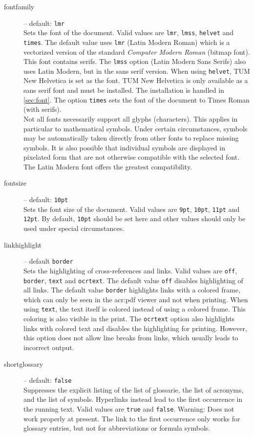 \begin{description}
	\item[fontfamily] -- default: \texttt{lmr} \\
	Sets the font of the document. Valid values are \texttt{lmr}, \texttt{lmss}, \texttt{helvet} and \texttt{times}. The default value uses \texttt{lmr} (Latin Modern Roman) which is a vectorized version of the \Latex standard \textit{Computer Modern Roman} (bitmap font). This font contains serifs. The \texttt{lmss} option (Latin Modern Sans Serifs) also uses Latin Modern, but in the sans serif version. When using \texttt{helvet}, TUM New Helvetica is set as the font. TUM New Helvetica is only available as a sans serif font and must be installed. The installation is handled in \autoref{sec:font}. The option \texttt{times} sets the font of the document to Times Roman (with serifs). \\
	Not all fonts necessarily support all glyphs (characters). This applies in particular to mathematical symbols. Under certain circumstances, symbols may be automatically taken directly from other fonts to replace missing symbols. It is also possible that individual symbols are displayed in pixelated form that are not otherwise compatible with the selected font. The Latin Modern font offers the greatest compatibility.
	
	\item[fontsize] -- default: \texttt{10pt} \\
	Sets the font size of the document. Valid values are \texttt{9pt}, \texttt{10pt}, \texttt{11pt} and \texttt{12pt}. By default, \texttt{10pt} should be set here and other values should only be used under special circumstances.
	
	\item[linkhighlight] -- default \texttt{border} \\
	Sets the highlighting of cross-references and links. Valid values are \texttt{off}, \texttt{border}, \texttt{text} and \texttt{ocrtext}. The default value \texttt{off} disables highlighting of all links. The default value \texttt{border} highlights links with a colored frame, which can only be seen in the \ac{acr:pdf} viewer and not when printing. When using \texttt{text}, the text itself is colored instead of using a colored frame. This coloring is also visible in the print. The \texttt{ocrtext} option also highlights links with colored text and disables the highlighting for printing. However, this option does not allow line breaks from links, which usually leads to incorrect output.
	
	\item[shortglossary] -- default: \texttt{false} \\
	Suppresses the explicit listing of the list of glossarie, the list of acronyms, and the list of symbols. Hyperlinks instead lead to the first occurrence in the running text. Valid values are \texttt{true} and \texttt{false}. Warning: Does not work properly at present. The link to the first occurrence only works for glossary entries, but not for abbreviations or formula symbols.
	

\end{description}
